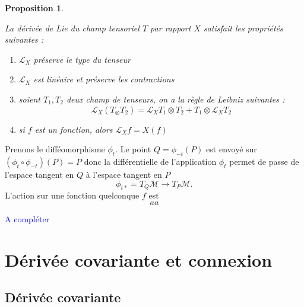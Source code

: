 \documentclass[a4paper,11pt]{report}
\theoremstyle{definition}
\theoremstyle{plain}
\newtheorem{prop}[thm]{Proposition}
\theoremstyle{definition}
\theoremstyle{remark}
\newcommand{\comp}{\begin{center}\textcolor{blue}{A compléter}\end{center}}
\newcommand{\M}{\mathscr{M}}
\renewcommand{\L}{\mathscr{L}}
\begin{document}
            \begin{prop}
            \begin{leftbar}
                La dérivée de Lie du champ tensoriel $T$ par rapport $X$ satisfait les propriétés suivantes :
                \begin{enumerate}[label = \textit{\roman*)}]
                    \item $\L_X$ préserve le type du tenseur
                    \item $\L_X$ est linéaire et préserve les contractions
                    \item soient $T_1,T_2$ deux champ de tenseurs, on a la règle de Leibniz suivantes :
                    \begin{equation}
                        \L_X(T_\otimes T_2) = \L_X T_1\otimes T_2+T_1\otimes \L_X T_2
                    \end{equation}
                    \item si $f$ est un fonction, alors 
                    $\L_Xf = X(f)$
                \end{enumerate}
            \end{leftbar}
            \end{prop}
            
            Prenons le difféomorphisme $\phi_t$. Le point $Q = \phi_{-t}(P)$ est envoyé sur $(\phi_{t}\circ\phi_{-t})(P) = P$ donc la différentielle de l'application $\phi_t$ permet de passe de l'espace tangent en $Q$ à l'espace tangent en $P$
            \begin{equation}
                \phi_{t*}=T_Q\M\to T_P\M.
            \end{equation}
            L'action sur une fonction quelconque $f$ est 
            \begin{equation}
                aa
            \end{equation}
            
            \comp
            
        
        \section{Dérivée covariante et connexion}
        
            \subsection{Dérivée covariante}
        
\end{document}

